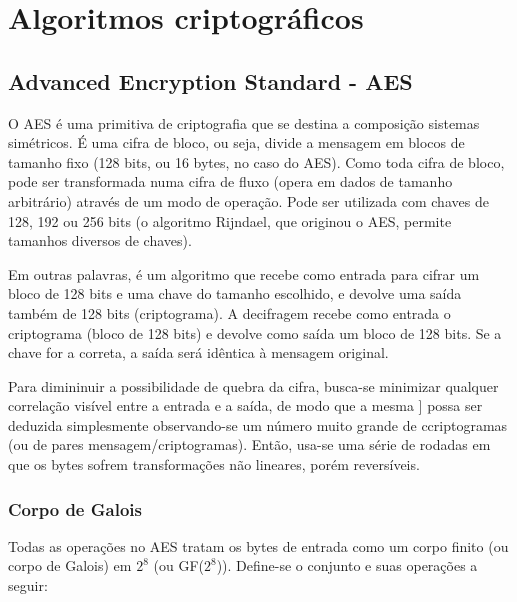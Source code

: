 \section{Algoritmos criptográficos}

\subsection{Advanced Encryption Standard - AES}

O AES é uma primitiva de criptografia que se destina a composição sistemas simétricos. É uma cifra de bloco, ou seja, divide a mensagem em blocos de tamanho fixo (128 bits, ou 16 bytes, no caso do AES). Como toda cifra de bloco, pode ser transformada numa cifra de fluxo (opera em dados de tamanho arbitrário) através de um modo de operação. Pode ser utilizada com chaves de 128, 192 ou 256 bits (o algoritmo Rijndael, que originou o AES, permite tamanhos diversos de chaves).

Em outras palavras, é um algoritmo que recebe como entrada para cifrar um bloco de 128 bits e uma chave do tamanho escolhido, e devolve uma saída também de 128 bits (criptograma). A decifragem recebe como entrada o criptograma (bloco de 128 bits) e devolve como saída um bloco de 128 bits. Se a chave for a correta, a saída será idêntica à mensagem original.

Para dimininuir a possibilidade de quebra da cifra, busca-se minimizar qualquer correlação visível entre a entrada e a saída, de modo que a mesma ] possa ser deduzida simplesmente observando-se um número muito grande de ccriptogramas (ou de pares mensagem/criptogramas). Então, usa-se uma série de rodadas em que os bytes sofrem transformações não lineares, porém reversíveis.

\subsubsection{Corpo de Galois}

Todas as operações no AES tratam os bytes de entrada como um corpo finito (ou corpo de Galois) em $2^{8}$ (ou GF($2^{8}$)). Define-se o conjunto e suas operações a seguir:


